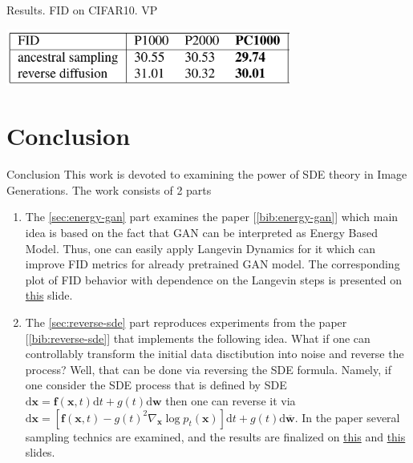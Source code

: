 \documentclass[xcolor=dvipsnames]{beamer}
\begin{document}
    \begin{frame}{\hypertarget{frame:res-vp}{Results. FID on CIFAR10. VP}}            
        \begin{center}
            \includegraphics[width=0.7\textwidth]{pics/VP_table.png}
        \end{center}
    \end{frame}
    \section{Conclusion}
    \begin{frame}{Conclusion}
        This work is devoted to examining the power of SDE theory in Image Generations.
        The work consists of 2 parts
        \begin{enumerate}
            \item The \ref{sec:energy-gan} part examines the paper [\ref{bib:energy-gan}] which main idea is based on the fact
            that GAN can be interpreted as Energy Based Model. Thus, one can easily
            apply Langevin Dynamics for it which can improve FID metrics for already pretrained 
            GAN model. The corresponding plot of FID behavior with dependence on  
            the Langevin steps is presented on \textcolor{blue}{\hyperlink{frame:res-energy}{this}} slide.
            \item The \ref{sec:reverse-sde} part reproduces experiments from the paper 
            [\ref{bib:reverse-sde}] that implements the following 
            idea. What if one can controllably transform the initial data disctibution into
            noise and reverse the process? Well, that can be done via reversing the SDE formula. Namely, 
            if one consider the SDE process that is defined by SDE 
            $\mathrm{d} \mathbf{x}=\mathbf{f}(\mathbf{x}, t) \mathrm{d} t+g(t) \mathrm{d} \mathbf{w}$
            then one can reverse it via 
            $\mathrm{d} \mathbf{x}=\left[\mathbf{f}(\mathbf{x}, t)-g(t)^2 \nabla_{\mathbf{x}} \log p_t(\mathbf{x})\right] \mathrm{d} t+g(t) \mathrm{d} \overline{\mathbf{w}}$. 
            In the paper several sampling technics are examined, and the results are finalized on 
            \textcolor{blue}{\hyperlink{frame:res-ve}{this}} and 
            \textcolor{blue}{\hyperlink{frame:res-vp}{this}} slides. 
        \end{enumerate}
    \end{frame}
\end{document}
